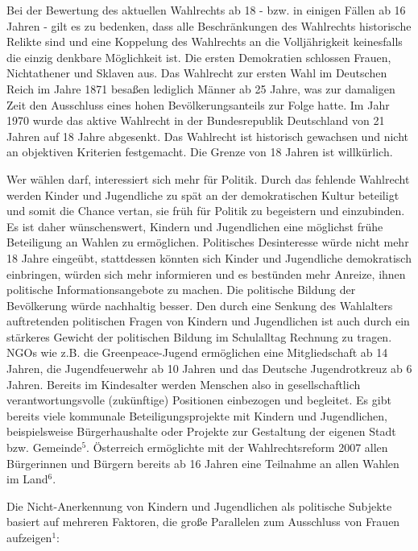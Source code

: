 {Bei der Bewertung des aktuellen Wahlrechts ab 18 - bzw. in einigen Fällen ab 16 Jahren - gilt es zu bedenken, dass alle Beschränkungen des Wahlrechts historische Relikte sind und eine Koppelung des Wahlrechts an die Volljährigkeit keinesfalls die einzig denkbare Möglichkeit ist. Die ersten {\Gu}Demokratien{\Go} schlossen Frauen, Nichtathener und Sklaven aus. Das Wahlrecht zur ersten Wahl im Deutschen Reich im Jahre 1871 besaßen lediglich Männer ab 25 Jahre, was zur damaligen Zeit den Ausschluss eines hohen Bevölkerungsanteils zur Folge hatte. Im Jahr 1970 wurde das aktive Wahlrecht in der Bundesrepublik Deutschland von 21 Jahren auf 18 Jahre abgesenkt. Das Wahlrecht ist historisch gewachsen und nicht an objektiven Kriterien festgemacht. Die Grenze von 18 Jahren ist willkürlich.

Wer wählen darf, interessiert sich mehr für Politik. Durch das fehlende Wahlrecht werden Kinder und Jugendliche zu spät an der demokratischen Kultur beteiligt und somit die Chance vertan, sie früh für Politik zu begeistern und einzubinden. Es ist daher wünschenswert, Kindern und Jugendlichen eine möglichst frühe Beteiligung an Wahlen zu ermöglichen. Politisches Desinteresse würde nicht mehr 18 Jahre eingeübt, stattdessen könnten sich Kinder und Jugendliche demokratisch einbringen, würden sich mehr informieren und es bestünden mehr Anreize, ihnen politische Informationsangebote zu machen. Die politische Bildung der Bevölkerung würde nachhaltig besser. Den durch eine Senkung des Wahlalters auftretenden politischen Fragen von Kindern und Jugendlichen ist auch durch ein stärkeres Gewicht der politischen Bildung im Schulalltag Rechnung zu tragen. NGOs wie z.B. die Greenpeace-Jugend ermöglichen eine Mitgliedschaft ab 14 Jahren, die Jugendfeuerwehr ab 10 Jahren und das Deutsche Jugendrotkreuz ab 6 Jahren. Bereits im Kindesalter werden Menschen also in gesellschaftlich verantwortungsvolle (zukünftige) Positionen einbezogen und begleitet. Es gibt bereits viele kommunale Beteiligungsprojekte mit Kindern und Jugendlichen, beispielsweise Bürgerhaushalte oder Projekte zur Gestaltung der eigenen Stadt bzw. Gemeinde$^5$. Österreich ermöglichte mit der Wahlrechtsreform 2007 allen Bürgerinnen und Bürgern bereits ab 16 Jahren eine Teilnahme an allen Wahlen im Land$^6$.

Die Nicht-Anerkennung von Kindern und Jugendlichen als politische Subjekte basiert auf mehreren Faktoren, die große Parallelen zum Ausschluss von Frauen aufzeigen$^1$:

}
